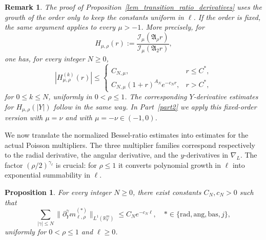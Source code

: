 \documentclass[12pt]{amsart}
\newtheorem{proposition}[theorem]{Proposition}
\newtheorem{remark}[theorem]{Remark}
\begin{document}
\begin{remark}\label{re:H}
The proof of Proposition~\ref{lem_transition_ratio_derivatives} uses the growth of the order only to keep the constants uniform in $\ell$. If the order is fixed, the same argument applies to every $\mu>-1$. More precisely, for
\begin{equation*}
    H_{\mu,\rho}(r):=
\frac{\mathcal I_\mu(\mathfrak A_\rho r)}{\mathcal I_\mu(\mathfrak A_2 r)},
\end{equation*}
one has, for every integer $N\ge 0$,
\begin{equation*}
    |H_{\mu,\rho}^{(k)}(r)|
\le
\begin{cases}
C_{N,\mu}, & r\le C^*,\\[4pt]
C_{N,\mu}(1+r)^{A_N}e^{-c_N r}, & r>C^*,
\end{cases}
\end{equation*}
for $0\le k\le N$, uniformly in $0<\rho\leq1$. The corresponding
$Y$-derivative estimates for $H_{\mu,\rho}(|Y|)$ follow in the same way. In
Part~\ref{part2} we apply this fixed-order version with $\mu=\nu$ and with
$\mu=-\nu\in(-1,0)$. 
\end{remark}

We now translate the normalized Bessel-ratio estimates into estimates for the
actual Poisson multipliers. The three multiplier families correspond respectively
to the radial derivative, the angular derivative, and the $y$-derivatives in
$\nabla_L$. The factor $(\rho/2)^{\gamma_\ell}$ is crucial: for $\rho\leq1$ it
converts polynomial growth in $\ell$ into exponential summability in $\ell$.





\begin{proposition}\label{lem_detailed_poisson_multiplier}
For every integer $N \ge 0$, there exist constants $C_N, c_N > 0$ such that
\begin{equation}\label{eq_detailed_poisson_multiplier_goal}
    \sum_{|\gamma|\le N}
    \bigl\|
        \partial_Y^\gamma m_{\ell,\rho}^{(*)}
    \bigr\|_{L^1(\mathbb R^m_Y)}
    \le
    C_N e^{-c_N\ell},
    \quad
    *\in \{\mathrm{rad}, \mathrm{ang}, \mathrm{bas}, j\},
\end{equation}
uniformly for $0<\rho\le 1$ and $\ell\ge 0$.
\end{proposition}
\end{document}
